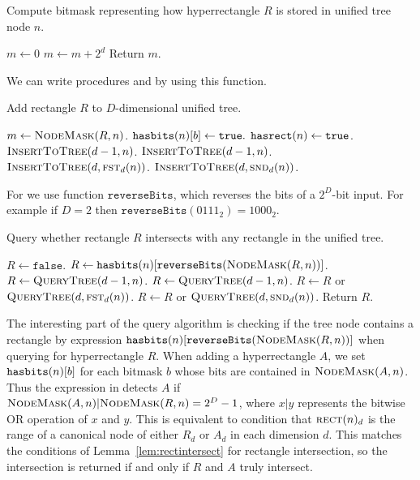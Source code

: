 \documentclass[english,gradu]{tktltiki2018}
\begin{document}
\begin{alg}\label{alg:maskof}
Compute bitmask representing how hyperrectangle $R$ is stored in unified tree node $n$.
\begin{algorithmic}
	\State $m\gets 0$
			\State $m\gets m + 2^d$
		\EndIf
	\EndFor
	\State Return $m$.
\EndProcedure
\end{algorithmic}
\end{alg}

We can write procedures \adddt and \checkdt by using this function.

\begin{alg}\label{alg:uadd}
Add rectangle $R$ to $D$-dimensional unified tree.
\begin{algorithmic}
		\State $m\gets\maskof{R,n}$.
				\State $\hasbits{n}{b}\gets\texttt{true}.$
			\EndIf
		\EndFor
		\State $\hasrect{n}\gets\texttt{true}$.
		\State $\adddt(d-1,n)$.
		\State $\adddt(d-1,n)$.
		\State $\adddt(d,\leftu{n}{d})$.
		\State $\adddt(d,\rightu{n}{d})$.
	\EndIf
\EndProcedure
\end{algorithmic}
\end{alg}

For \checkdt we use function $\texttt{reverseBits}$, which reverses the bits of a $2^D$-bit input.
For example if $D=2$ then $\texttt{reverseBits}(0111_2)=1000_2$.

\begin{alg}\label{alg:ucheck}
Query whether rectangle $R$ intersects with any rectangle in the unified tree.
\begin{algorithmic}
	\State $R\gets\texttt{false}$.
		\State $R\gets\hasbits{n}{\texttt{reverseBits}(\maskof{R,n})}$.
		\State $R\gets\checkdt(d-1,n)$.
		\State $R\gets\checkdt(d-1,n)$.
		\State $R\gets R$ or $\checkdt(d,\leftu{n}{d})$.
		\State $R\gets R$ or $\checkdt(d,\rightu{n}{d})$.
	\EndIf
	\State Return $R$.
\EndProcedure
\end{algorithmic}
\end{alg}

The interesting part of the query algorithm is checking if the tree node contains a rectangle by expression $\hasbits{n}{\texttt{reverseBits}(\maskof{R,n})}$ when querying for hyperrectangle $R$.
When adding a hyperrectangle $A$, we set $\hasbits{n}{b}$ for each bitmask $b$ whose bits are contained in $\maskof{A,n}$.
Thus the expression in \checkdt detects $A$ if $\maskof{A,n}|\maskof{R,n}=2^D-1$, where $x|y$ represents the bitwise OR operation of $x$ and $y$.
This is equivalent to condition that $\rect{n}_d$ is the range of a canonical node of either $R_d$ or $A_d$ in each dimension $d$.
This matches the conditions of Lemma~\ref{lem:rectintersect} for rectangle intersection, so the intersection is returned if and only if $R$ and $A$ truly intersect.
\end{document}
